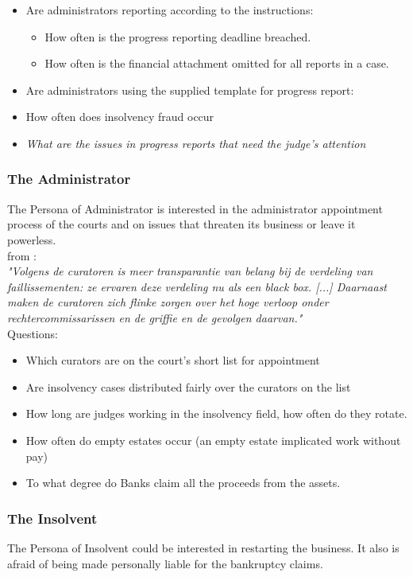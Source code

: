 \begin{itemize}
	\item Are administrators reporting according to the instructions:
	\begin{itemize}
		\item How often is the progress reporting deadline breached.
		\item How often is the financial attachment omitted for all reports in a case.
	\end{itemize}
	\item Are administrators using the supplied template for progress report:
	\item How often does insolvency fraud occur
	\item \textit{What are the issues in progress reports that need the judge's attention}
\end{itemize}

\subsubsection{The Administrator}
The Persona of Administrator is interested in the administrator appointment process of the courts and on issues that threaten its business or leave it powerless.\\

from \cite{samr_2017:1}:\\
\textit{"Volgens de curatoren is meer transparantie van belang
bij de verdeling van faillissementen: ze ervaren deze
verdeling nu als een black box. [...] Daarnaast maken de curatoren
zich flinke zorgen over het hoge verloop onder rechtercommissarissen
en de griffie en de gevolgen daarvan."}\\

Questions:
\begin{itemize}
	\item Which curators are on the court’s short list for appointment
	\item Are insolvency cases distributed fairly over the curators on the list
	\item How long are judges working in the insolvency field, how often do they rotate.
	\item How often do empty estates occur (an empty estate implicated work without pay)
	\item To what degree do Banks claim all the proceeds from the assets.
\end{itemize}

\subsubsection{The Insolvent}
The Persona of Insolvent could be interested in restarting the business. It also is afraid of being made personally liable for the bankruptcy claims.

